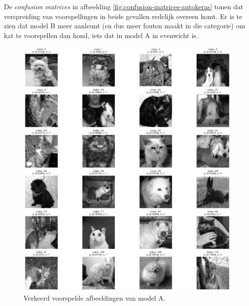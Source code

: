 De \textit{confusion matrices} in afbeelding \ref{fig:confusion-matrices-autokeras} tonen dat verspreiding van voorspellingen in beide gevallen redelijk overeen komt. Er is te zien dat model B meer aanleunt (en dus meer fouten maakt in die categorie) om kat te voorspellen dan hond, iets dat in model A in evenwicht is.

\begin{figure}
    \centering
    \includegraphics[width=\linewidth]{img/autokeras-5-wrong-images.png}
    \caption{Verkeerd voorspelde afbeeldingen van model A.}
    \label{fig:wrong-prediction-autokeras-5}
\end{figure}

